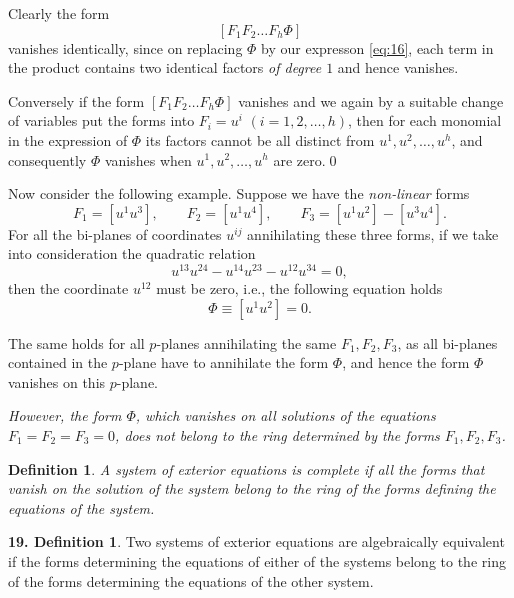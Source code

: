 \documentclass[leqno,11pt]{book}
\numberwithin{equation}{chapter}
\theoremstyle{shape1}
\newtheorem*{dfn*}{\hspace{15pt}Definition}
\theoremstyle{shape0}
\theoremstyle{shape2}
\theoremstyle{definition}
\begin{document}
Clearly the form
\[
[F_{1}F_{2}\dots F_{h}\Phi]
\]
vanishes identically, since on replacing $\Phi$ by our expresson \eqref{eq:16}, each term in the product contains two identical factors \emph{of degree $1$} and hence vanishes.

Conversely if the form $[F_{1}F_{2}\dots F_{h}\Phi]$ vanishes and we again by a suitable change of variables put the forms into $F_{i}=u^{i}$ $(i=1,2,\dots,h)$, then for each monomial in the expression of $\Phi$ its factors cannot be all distinct from $u^{1},u^{2},\dots,u^{h}$, and consequently $\Phi$ vanishes when $u^{1},u^{2},\dots,u^{h}$ are zero.\qed

\vspace{12pt}\fsec Now consider the following example. Suppose we have the \emph{non-linear} forms
\[
F_{1}=[u^{1}u^{3}],\qquad F_{2}=[u^{1}u^{4}],\qquad F_{3}=[u^{1}u^{2}]-[u^{3}u^{4}].
\]
For all the bi-planes of coordinates $u^{ij}$ annihilating these three forms, if we take into consideration the quadratic relation
\[
u^{13}u^{24}-u^{14}u^{23}-u^{12}u^{34}=0,
\]
then the coordinate $u^{12}$ must be zero, {i.e.}, the following equation holds
\[
\Phi\equiv[u^{1}u^{2}]=0.
\]

The same holds for all $p$-planes annihilating the same $F_{1},F_{2},F_{3}$, as all bi-planes contained in the $p$-plane have to annihilate the form $\Phi$, and hence the form $\Phi$ vanishes on this $p$-plane.

\emph{However, the form $\Phi$, which vanishes on all solutions of the equations $F_{1}=F_{2}=F_{3}=0$, does not belong to the ring determined by the forms $F_{1},F_{2},F_{3}$.}

\begin{dfn*}
  A system of exterior equations is  \emph{complete}  if all the forms that vanish on the solution of the system belong to the ring of the forms defining the equations of the system.
\end{dfn*}

\vspace{6pt}\addtocounter{frenchsec}{1}
\theoremstyle{shape1}
\newtheorem*{def19}{\hspace{15pt}\textbf{19.} Definition}
\begin{def19}
  Two systems of exterior equations are  algebraically equivalent if the forms determining the equations of either of the systems belong to the ring of the forms determining the equations of the other system.
\end{def19}
\end{document}
